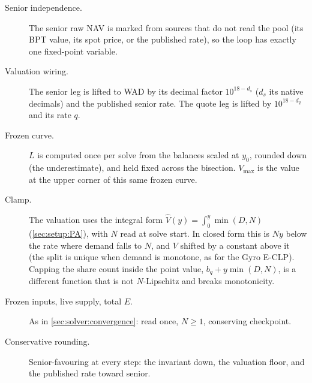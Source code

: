 \begin{description}
  \item[Senior independence.] The senior raw NAV is marked from sources
    that do not read the pool (its BPT value, its spot price, or the
    published rate), so the loop has exactly one fixed-point variable.
  \item[Valuation wiring.] The senior leg is lifted to WAD by its
    decimal factor $10^{18 - d_s}$ ($d_s$ its native decimals) and the
    published senior rate. The quote leg is lifted by $10^{18 - d_q}$
    and its rate $q$.
  \item[Frozen curve.] $L$ is computed once per solve from the balances
    scaled at $y_0$, rounded down (the underestimate), and held fixed across the
    bisection. $V_{\max}$ is the value at the upper corner of this same
    frozen curve.
  \item[Clamp.] The valuation uses the integral form
    $\widehat{V}(y) = \int_0^y \min(D, N)$ (\cref{sec:setup:PA}), with $N$
    read at solve start. In closed form this is $N y$ below the rate
    where demand falls to $N$, and $V$ shifted by a constant above it
    (the split is unique when demand is monotone, as for the Gyro
    E-CLP). Capping the share count inside the point value,
    $b_q + y\min(D,N)$, is a different function that is not $N$-Lipschitz
    and breaks monotonicity.
  \item[Frozen inputs, live supply, total $E$.] As in
    \cref{sec:solver:convergence}: read once, $N \geq 1$, conserving
    checkpoint.
  \item[Conservative rounding.] Senior-favouring at every step: the
    invariant down, the valuation floor, and the published rate toward
    senior.
\end{description}
